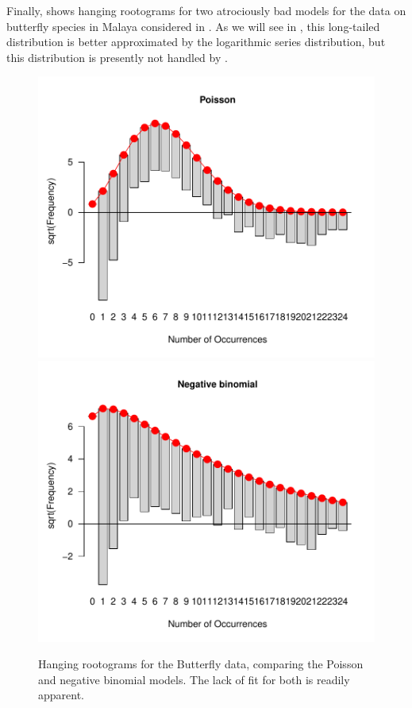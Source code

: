 \documentclass[11pt]{book}
\renewenvironment{knitrout}{\small\renewcommand{\baselinestretch}{.85}}{} %
\begin{document}
Finally,  shows hanging rootograms for two 
atrociously bad models for the data on butterfly species in Malaya
considered in . As we will see in ,
this long-tailed distribution is better approximated by the logarithmic series
distribution, but this distribution is presently not handled by .
\begin{knitrout}
\color{fgcolor}\begin{kframe}
\begin{alltt}
 \hlstd{=}\hlstd{)}
 \hlkwb{<-}  \hlstd{=}\hlstd{)}
 \hlkwb{<-}  \hlstd{=}\hlstd{)}
 \hlstd{=}\hlstd{)}
 \hlstd{=}\hlstd{)}
\end{alltt}
\end{kframe}\begin{figure}[!htbp]


\centerline{\includegraphics[width=.48\textwidth]{ch03/fig/But-fit1} 
\includegraphics[width=.48\textwidth]{ch03/fig/But-fit2} }

\caption[Hanging rootograms for the Butterfly data, comparing the Poisson and negative binomial models]{Hanging rootograms for the Butterfly data, comparing the Poisson and negative binomial models. The lack of fit for both is readily apparent.\label{fig:But-fit}}
\end{figure}


\end{knitrout}
\end{document}
